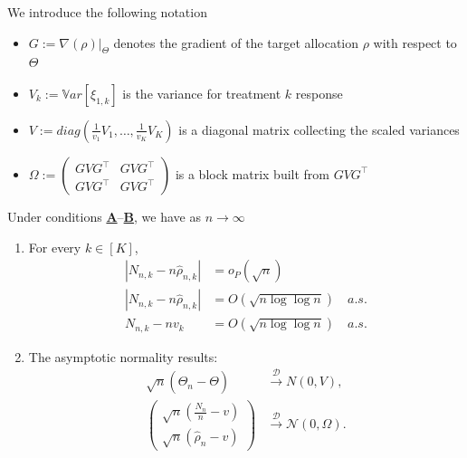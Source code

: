 \begin{theorem}\label{thm:normality-gen-erade}
	We introduce the following notation
	\begin{itemize}
		\item \(G := \nabla (\rho)\big|_{\Theta}\) denotes the gradient of the target allocation $\rho$ with respect to $\Theta$
		\item \(V_k := \mathbb{V}ar[\xi_{1,k}]\)  is the variance for treatment \(k\) response
		\item \(V := diag\left(\frac{1}{v_1}V_1, \dots, \frac{1}{v_K}V_K\right)\) is a diagonal matrix collecting the scaled variances
		\item \(\Omega := 
		\begin{pmatrix}
			GVG^{\top } & GVG^{\top } \\
			GVG^{\top } & GVG^{\top }
		\end{pmatrix}\) is a block matrix built from \(GVG^{\top }\)
	\end{itemize}
	Under conditions \hyperlink{CA}{\textbf{A}}--\hyperlink{CB}{\textbf{B}}, we have as \(n \to \infty\)
	
	\begin{enumerate}[label=(\roman*)]
		\item  For every \(k \in [K]\),
		\begin{align}
			|N_{n,k} - n\hat{\rho}_{n,k}| &= o_P(\sqrt{n})\label{eq:thm-res-1}\\
			|N_{n,k} - n\hat{\rho}_{n,k}| &= O(\sqrt{n \log\log n})\quad a.s.\label{eq:thm-res-2}\\
			N_{n,k}-n v_k&=O(\sqrt{n\log\log n})\quad a.s.\label{eq:thm-res-3}
		\end{align}
		\item The asymptotic normality results:
		\begin{align}\label{eq:thm-res-4}
			\sqrt{n}(\hat{\Theta}_n - \Theta) &\xrightarrow{\mathcal{D}} N(0,V),\\
			\label{eq:thm-res-5}
			\begin{pmatrix}
				\sqrt{n} \left( \frac{N_n}{n} - v \right)\\
				\sqrt{n} (\hat{\rho}_n - v)
			\end{pmatrix}
			&\xrightarrow{\mathcal{D}} \mathcal{N}(0,\Omega).
		\end{align}		
	\end{enumerate}
\end{theorem}


